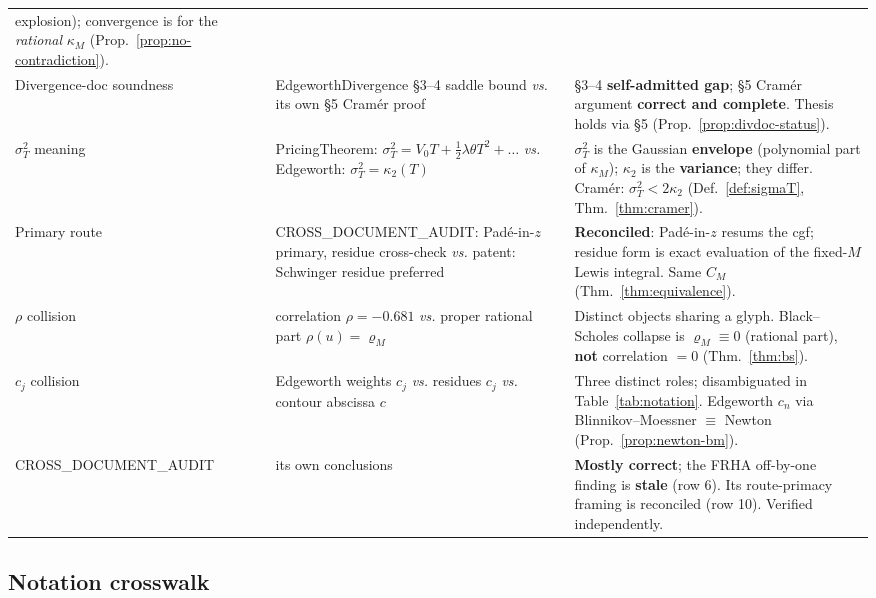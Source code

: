 \documentclass[11pt]{article}
\theoremstyle{plain}
\theoremstyle{definition}
\theoremstyle{remark}
\begin{document}
{\begin{longtable}{@{}>{\raggedright\arraybackslash}p{}
                     >{\raggedright\arraybackslash}p{}
                     >{\raggedright\arraybackslash}p{}@{}}
explosion); convergence is for the \emph{rational} $\kappa_M$
(Prop.~\ref{prop:no-contradiction}).\\
\addlinespace
Divergence-doc soundness &
EdgeworthDivergence \S3--4 saddle bound \emph{vs.}
its own \S5 Cramér proof &
\S3--4 \textbf{self-admitted gap}; \S5 Cramér argument \textbf{correct and
complete}. Thesis holds via \S5 (Prop.~\ref{prop:divdoc-status}).\\
\addlinespace
$\sigma_T^2$ meaning &
PricingTheorem: $\sigma_T^2=V_0T+\tfrac12\lambda\theta T^2+\dots$ \emph{vs.}
Edgeworth: $\sigma_T^2=\kappa_2(T)$ &
$\sigma_T^2$ is the Gaussian \textbf{envelope} (polynomial part of $\kappa_M$);
$\kappa_2$ is the \textbf{variance}; they differ. Cramér: $\sigma_T^2<2\kappa_2$
(Def.~\ref{def:sigmaT}, Thm.~\ref{thm:cramer}).\\
\addlinespace
Primary route &
CROSS\_DOCUMENT\_AUDIT: Padé-in-$z$ primary, residue cross-check \emph{vs.}
patent: Schwinger residue preferred &
\textbf{Reconciled}: Padé-in-$z$ resums the cgf; residue form is exact evaluation
of the fixed-$M$ Lewis integral. Same $C_M$ (Thm.~\ref{thm:equivalence}).\\
\addlinespace
$\rho$ collision &
correlation $\rho=-0.681$ \emph{vs.}
proper rational part $\rho(u)=\varrho_M$ &
Distinct objects sharing a glyph. Black--Scholes collapse is $\varrho_M\equiv0$
(rational part), \textbf{not} correlation $=0$ (Thm.~\ref{thm:bs}).\\
\addlinespace
$c_j$ collision &
Edgeworth weights $c_j$ \emph{vs.} residues $c_j$ \emph{vs.}
contour abscissa $c$ &
Three distinct roles; disambiguated in Table~\ref{tab:notation}. Edgeworth $c_n$
via Blinnikov--Moessner $\equiv$ Newton (Prop.~\ref{prop:newton-bm}).\\
\addlinespace
CROSS\_DOCUMENT\_AUDIT &
its own conclusions &
\textbf{Mostly correct}; the FRHA off-by-one finding is \textbf{stale} (row 6).
Its route-primacy framing is reconciled (row 10). Verified independently.\\
\end{longtable}
}

\subsection*{Notation crosswalk}
\end{document}
